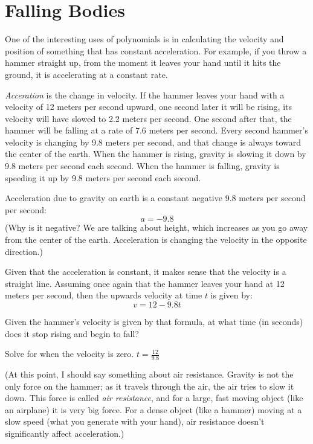 \chapter{Falling Bodies}

One of the interesting uses of polynomials is in calculating the
velocity and position of something that has constant acceleration. For
example, if you throw a hammer straight up, from the moment it leaves
your hand until it hits the ground, it is accelerating at a constant
rate.

\emph{Acceration} is the change in velocity. If the hammer leaves your
hand with a velocity of 12 meters per second upward, one second later
it will be rising, its velocity will have slowed to 2.2 meters per
second. One second after that, the hammer will be falling at a rate of
7.6 meters per second. Every second hammer's velocity is changing by
9.8 meters per second, and that change is always toward the center of
the earth. When the hammer is rising, gravity is slowing it down by
9.8 meters per second each second.  When the hammer is falling,
gravity is speeding it up by 9.8 meters per second each second.

Acceleration due to gravity on earth is a constant negative 9.8 meters per second per second:
\begin{equation*}
a = -9.8   
\end{equation*}
(Why is it negative? We are talking about height, which increases as
you go away from the center of the earth. Acceleration is changing the
velocity in the opposite direction.)

Given that the acceleration is constant, it makes sense that the
velocity is a straight line. Assuming once again that the hammer
leaves your hand at 12 meters per second, then the upwards velocity at
time $t$ is given by:
\begin{equation*}
  v = 12 - 9.8t
\end{equation*}

\begin{Exercise}[title={When is the apex of flight?}, label=vapex]
  Given the hammer's velocity is given by that formula, at what time (in seconds)
  does it stop rising and begin to fall?
\end{Exercise}
\begin{Answer}[ref=vapex]
  Solve for when the velocity is zero. $t = \frac{12}{9.8}$
\end{Answer}

(At this point, I should say something about air resistance. Gravity
is not the only force on the hammer; as it travels through the air,
the air tries to slow it down. This force is called \emph{air resistance},
and for a large, fast moving object (like an airplane) it is very big force. For a
dense object (like a hammer) moving at a slow speed (what you generate
with your hand), air resistance doesn't significantly affect acceleration.)

